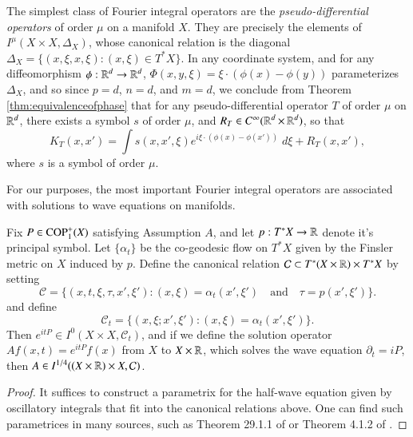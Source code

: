 The simplest class of Fourier integral operators are the \emph{pseudo-differential operators} of order $\mu$ on a manifold $X$. They are precisely the elements of $I^\mu( X \times X, \Delta_X )$, whose canonical relation is the diagonal $\Delta_X = \{ (x,\xi,x,\xi): (x,\xi) \in T^* X \}$. In any coordinate system, and for any diffeomorphism $\phi: \operatorname{\mathbb{R}}^d \to \operatorname{\mathbb{R}}^d$, $\Phi(x,y,\xi) = \xi \cdot (\phi(x) - \phi(y))$ parameterizes $\Delta_X$, and so since $p = d$, $n = d$, and $m = d$, we conclude from Theorem \ref{thm:equivalenceofphase} that for any pseudo-differential operator $T$ of order $\mu$ on $\operatorname{\mathbb{R}}^d$, there exists a symbol $s$ of order $\mu$, and $R_T \in C^\infty(\operatorname{\mathbb{R}}^d \times \operatorname{\mathbb{R}}^d)$, so that
%
\begin{equation}
  K_T(x,x') = \int s(x,x',\xi) e^{i \xi \cdot (\phi(x) - \phi(x'))}\; d\xi + R_T(x,x'),
\end{equation}
%
where $s$ is a symbol of order $\mu$.

For our purposes, the most important Fourier integral operators are associated with solutions to wave equations on manifolds.

\begin{theorem} \label{waveisanFIOTheorem}
  Fix $P \in {\text{COP}^{+}_{{1}}}(X)$ satisfying Assumption $A$, and let $p: T^* X \to \operatorname{\mathbb{R}}$ denote it's principal symbol. Let $\{ \alpha_t \}$ be the co-geodesic flow on $T^* X$ given by the Finsler metric on $X$ induced by $p$.  Define the canonical relation $\mathcal{C} \subset T^* (X \times \operatorname{\mathbb{R}}) \times T^* X$ by setting
  \[ \mathcal{C} = \{ (x,t,\xi,\tau,x',\xi') : (x,\xi) = \alpha_t(x',\xi') \quad\text{and}\quad \tau = p(x',\xi') \}. \]
  and define
  \[ \mathcal{C}_t = \{ (x,\xi;x',\xi') : (x,\xi) = \alpha_t(x',\xi') \}. \]
  Then $e^{itP} \in I^0(X \times X, \mathcal{C}_t)$, and if we define the solution operator $Af(x,t) = e^{i t P}\!f(x)$ from $X$ to $X \times \operatorname{\mathbb{R}}$, which solves the wave equation $\partial_t = i P$, then $A \in I^{1/4}((X \times \operatorname{\mathbb{R}}) \times X, \mathcal{C})$.
\end{theorem}
\begin{proof}
  It suffices to construct a parametrix for the half-wave equation given by oscillatory integrals that fit into the canonical relations above. One can find such parametrices in many sources, such as Theorem 29.1.1 of \cite{Hormander4} or Theorem 4.1.2 of \cite{Sogge}.
\end{proof}

